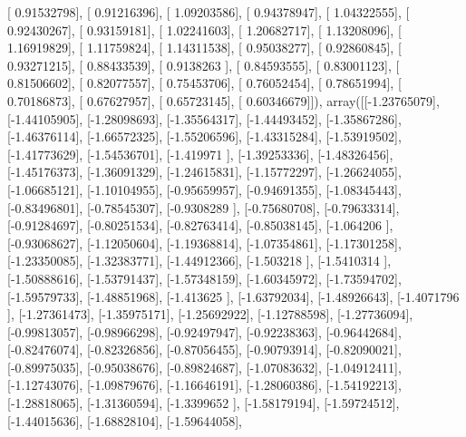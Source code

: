 \documentclass{article}
\begin{document}
       [ 0.91532798],
       [ 0.91216396],
       [ 1.09203586],
       [ 0.94378947],
       [ 1.04322555],
       [ 0.92430267],
       [ 0.93159181],
       [ 1.02241603],
       [ 1.20682717],
       [ 1.13208096],
       [ 1.16919829],
       [ 1.11759824],
       [ 1.14311538],
       [ 0.95038277],
       [ 0.92860845],
       [ 0.93271215],
       [ 0.88433539],
       [ 0.9138263 ],
       [ 0.84593555],
       [ 0.83001123],
       [ 0.81506602],
       [ 0.82077557],
       [ 0.75453706],
       [ 0.76052454],
       [ 0.78651994],
       [ 0.70186873],
       [ 0.67627957],
       [ 0.65723145],
       [ 0.60346679]]), array([[-1.23765079],
       [-1.44105905],
       [-1.28098693],
       [-1.35564317],
       [-1.44493452],
       [-1.35867286],
       [-1.46376114],
       [-1.66572325],
       [-1.55206596],
       [-1.43315284],
       [-1.53919502],
       [-1.41773629],
       [-1.54536701],
       [-1.419971  ],
       [-1.39253336],
       [-1.48326456],
       [-1.45176373],
       [-1.36091329],
       [-1.24615831],
       [-1.15772297],
       [-1.26624055],
       [-1.06685121],
       [-1.10104955],
       [-0.95659957],
       [-0.94691355],
       [-1.08345443],
       [-0.83496801],
       [-0.78545307],
       [-0.9308289 ],
       [-0.75680708],
       [-0.79633314],
       [-0.91284697],
       [-0.80251534],
       [-0.82763414],
       [-0.85038145],
       [-1.064206  ],
       [-0.93068627],
       [-1.12050604],
       [-1.19368814],
       [-1.07354861],
       [-1.17301258],
       [-1.23350085],
       [-1.32383771],
       [-1.44912366],
       [-1.503218  ],
       [-1.5410314 ],
       [-1.50888616],
       [-1.53791437],
       [-1.57348159],
       [-1.60345972],
       [-1.73594702],
       [-1.59579733],
       [-1.48851968],
       [-1.413625  ],
       [-1.63792034],
       [-1.48926643],
       [-1.4071796 ],
       [-1.27361473],
       [-1.35975171],
       [-1.25692922],
       [-1.12788598],
       [-1.27736094],
       [-0.99813057],
       [-0.98966298],
       [-0.92497947],
       [-0.92238363],
       [-0.96442684],
       [-0.82476074],
       [-0.82326856],
       [-0.87056455],
       [-0.90793914],
       [-0.82090021],
       [-0.89975035],
       [-0.95038676],
       [-0.89824687],
       [-1.07083632],
       [-1.04912411],
       [-1.12743076],
       [-1.09879676],
       [-1.16646191],
       [-1.28060386],
       [-1.54192213],
       [-1.28818065],
       [-1.31360594],
       [-1.3399652 ],
       [-1.58179194],
       [-1.59724512],
       [-1.44015636],
       [-1.68828104],
       [-1.59644058],
\end{document}
